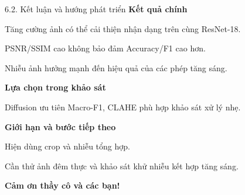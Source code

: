 \documentclass[aspectratio=169,10pt]{beamer}
\begin{document}
\begin{frame}{6.2. Kết luận và hướng phát triển}\relax
\textbf{Kết quả chính}\par
Tăng cường ảnh có thể cải thiện nhận dạng trên cùng ResNet-18.\par
PSNR/SSIM cao không bảo đảm Accuracy/F1 cao hơn.\par
Nhiễu ảnh hưởng mạnh đến hiệu quả của các phép tăng sáng.
\par\vspace{3mm}
\textbf{Lựa chọn trong khảo sát}\par
Diffusion ưu tiên Macro-F1, CLAHE phù hợp khảo sát xử lý nhẹ.
\par\vspace{3mm}
\textbf{Giới hạn và bước tiếp theo}\par
Hiện dùng crop và nhiễu tổng hợp.\par
Cần thử ảnh đêm thực và khảo sát khử nhiễu kết hợp tăng sáng.
\par\vspace{3mm}
{\color{Teal}\large\bfseries Cảm ơn thầy cô và các bạn!}
\end{frame}
\end{document}
